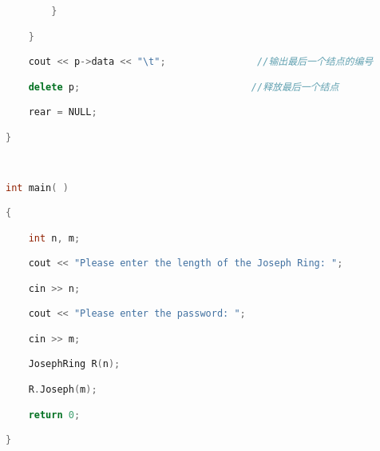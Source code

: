 \begin{lstlisting}[language=C++]
        }

    }

    cout << p->data << "\t";                //输出最后一个结点的编号

    delete p;                              //释放最后一个结点

    rear = NULL;

}

  

int main( )

{

    int n, m;

    cout << "Please enter the length of the Joseph Ring: ";  

    cin >> n;

    cout << "Please enter the password: ";            

    cin >> m;

    JosephRing R(n);

    R.Joseph(m);

    return 0;                  

}
\end{lstlisting}